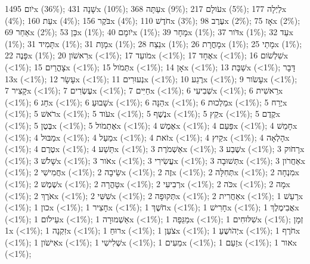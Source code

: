 \texthebrew{יֹום} 1495x (36\%); \texthebrew{שָׁנָה} 431x (10\%); \texthebrew{עַתָּה} 368x (9\%); \texthebrew{עֹולָם} 217x (5\%); \texthebrew{לַיְלָה} 177x (4\%); \texthebrew{עֵת} 160x (4\%); \texthebrew{בֹּקֶר} 156x (4\%); \texthebrew{חֹדֶשׁ} 110x (3\%); \texthebrew{עֶרֶב} 98x (2\%); \texthebrew{אָז} 75x (2\%); \texthebrew{אַחַר} 69x (2\%); \texthebrew{כֵּן} 53x (1\%); \texthebrew{יֹומָם} 40x (1\%); \texthebrew{מָחָר} 39x (1\%); \texthebrew{דֹּור} 37x (1\%); \texthebrew{עַד} 32x (1\%); \texthebrew{תָּמִיד} 31x (1\%); \texthebrew{מָוֶת} 31x (1\%); \texthebrew{נֵצַח} 28x (1\%); \texthebrew{מָחֳרָת} 26x (1\%); \texthebrew{מָתַי} 25x (1\%); \texthebrew{פָּנֶה} 22x (1\%); \texthebrew{רִאשֹׁון} 20x (<1\%); \texthebrew{מֹועֵד} 17x (<1\%); \texthebrew{אֶחָד} 17x (<1\%); \texthebrew{שִׁלְשֹׁום} 16x (<1\%); \texthebrew{צָהֳרַיִם} 15x (<1\%); \texthebrew{תְּמֹול} 15x (<1\%); \texthebrew{אָן} 14x (<1\%); \texthebrew{שַׁבָּת} 13x (<1\%); \texthebrew{דָּבָר} 13x (<1\%); \texthebrew{עָשָׂר} 12x (<1\%); \texthebrew{נְעוּרִים} 11x (<1\%); \texthebrew{רֶגַע} 10x (<1\%); \texthebrew{עָשֹׂור} 9x (<1\%); \texthebrew{קָצִיר} 7x (<1\%); \texthebrew{עֶשְׂרִים} 7x (<1\%); \texthebrew{חַיִּים} 7x (<1\%); \texthebrew{שְׁבִיעִי} 6x (<1\%); \texthebrew{רֵאשִׁית} 6x (<1\%); \texthebrew{חַג} 6x (<1\%); \texthebrew{שָׁבוּעַ} 6x (<1\%); \texthebrew{הֵנָּה} 6x (<1\%); \texthebrew{מַלְכוּת} 6x (<1\%); \texthebrew{יֶרַח} 5x (<1\%); \texthebrew{רֹאשׁ} 5x (<1\%); \texthebrew{עֹוד} 5x (<1\%); \texthebrew{נֶשֶׁף} 5x (<1\%); \texthebrew{קֵץ} 5x (<1\%); \texthebrew{קֶדֶם} 5x (<1\%); \texthebrew{בֶּטֶן} 5x (<1\%); \texthebrew{אֶתְמֹול} 5x (<1\%); \texthebrew{אֶמֶשׁ} 4x (<1\%); \texthebrew{פַּעַם} 4x (<1\%); \texthebrew{חָמֵשׁ} 4x (<1\%); \texthebrew{מַבּוּל} 4x (<1\%); \texthebrew{מַעַל} 4x (<1\%); \texthebrew{זֹאת} 4x (<1\%); \texthebrew{קַיִץ} 4x (<1\%); \texthebrew{הָלְאָה} 4x (<1\%); \texthebrew{טֶרֶם} 4x (<1\%); \texthebrew{תֵּשַׁע} 4x (<1\%); \texthebrew{אַשְׁמֹרֶת} 3x (<1\%); \texthebrew{שֶׁבַע} 3x (<1\%); \texthebrew{רָחֹוק} 3x (<1\%); \texthebrew{שָׁלֹשׁ} 3x (<1\%); \texthebrew{אֹור} 3x (<1\%); \texthebrew{עֲשִׂירִי} 3x (<1\%); \texthebrew{תְּשׁוּבָה} 3x (<1\%); \texthebrew{אַחֲרֹון} 3x (<1\%); \texthebrew{חֲמִישִׁי} 2x (<1\%); \texthebrew{שֵׂיבָה} 2x (<1\%); \texthebrew{זֶה} 2x (<1\%); \texthebrew{תְּחִלָּה} 2x (<1\%); \texthebrew{מִנְחָה} 2x (<1\%); \texthebrew{שֶׁמֶשׁ} 2x (<1\%); \texthebrew{טָהֳרָה} 2x (<1\%); \texthebrew{רְבִיעִי} 2x (<1\%); \texthebrew{כֹּה} 2x (<1\%); \texthebrew{מָה} 2x (<1\%); \texthebrew{אֹרֶךְ} 2x (<1\%); \texthebrew{שִׁשִּׁי} 2x (<1\%); \texthebrew{תְּקוּפָה} 2x (<1\%); \texthebrew{אַחֲרִית} 2x (<1\%); \texthebrew{רַעַשׁ} 1x (<1\%); \texthebrew{כון} 1x (<1\%); \texthebrew{חָצִיר} 1x (<1\%); \texthebrew{חֹשֶׁךְ} 1x (<1\%); \texthebrew{חָרִישׁ} 1x (<1\%); \texthebrew{אֲבִימֶלֶךְ} 1x (<1\%); \texthebrew{עֵילֹום} 1x (<1\%); \texthebrew{אַשְׁמוּרָה} 1x (<1\%); \texthebrew{מַגֵּפָה} 1x (<1\%); \texthebrew{שִׁלּוּחִים} 1x (<1\%); \texthebrew{זְמָן} 1x (<1\%); \texthebrew{זִקְנָה} 1x (<1\%); \texthebrew{רוּחַ} 1x (<1\%); \texthebrew{צֹעַן} 1x (<1\%); \texthebrew{יְהֹושֻׁעַ} 1x (<1\%); \texthebrew{חֹרֶף} 1x (<1\%); \texthebrew{אִישֹׁון} 1x (<1\%); \texthebrew{שְׁלִישִׁי} 1x (<1\%); \texthebrew{מֵעִים} 1x (<1\%); \texthebrew{זַעַם} 1x (<1\%); \texthebrew{אור} 1x (<1\%); 